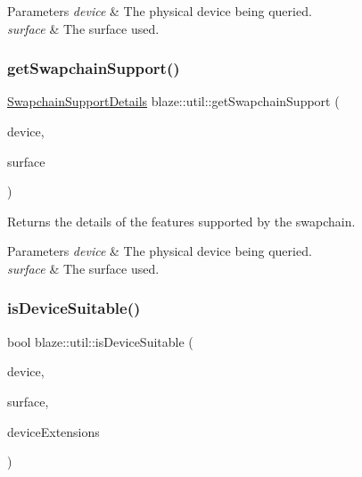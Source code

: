 \begin{DoxyParams}{Parameters}
{\em device} & The physical device being queried. \\
\hline
{\em surface} & The surface used. \\
\hline
\end{DoxyParams}
\mbox{\label{namespaceblaze_1_1util_a11dc99b58ff4a58b45175e005acbf406}} 
\subsubsection{\texorpdfstring{get\+Swapchain\+Support()}{getSwapchainSupport()}}
{\footnotesize\ttfamily \hyperlink{structblaze_1_1util_1_1SwapchainSupportDetails}{Swapchain\+Support\+Details} blaze\+::util\+::get\+Swapchain\+Support (\begin{DoxyParamCaption}\item[{Vk\+Physical\+Device}]{device,  }\item[{Vk\+Surface\+K\+HR}]{surface }\end{DoxyParamCaption})}



Returns the details of the features supported by the swapchain. 


\begin{DoxyParams}{Parameters}
{\em device} & The physical device being queried. \\
\hline
{\em surface} & The surface used. \\
\hline
\end{DoxyParams}
\mbox{\label{namespaceblaze_1_1util_a084200da1446d1dabeb9b83eaf43dcb8}} 
\subsubsection{\texorpdfstring{is\+Device\+Suitable()}{isDeviceSuitable()}}
{\footnotesize\ttfamily bool blaze\+::util\+::is\+Device\+Suitable (\begin{DoxyParamCaption}\item[{Vk\+Physical\+Device}]{device,  }\item[{Vk\+Surface\+K\+HR}]{surface,  }\item[{const std\+::vector$<$ const char $\ast$ $>$ \&}]{device\+Extensions }\end{DoxyParamCaption})}



